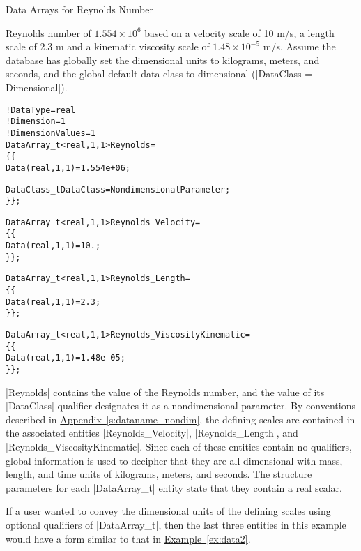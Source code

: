 \begin{example}{Data Arrays for Reynolds Number}
\label{ex:data5}

Reynolds number of $1.554 \!\times\! 10^{6}$ based on a velocity scale of
10 m/s, a length scale of 2.3 m and a kinematic viscosity scale of
$1.48 \!\times\! 10^{-5}$ m/s.
Assume the database has globally set the dimensional units to kilograms,
meters, and seconds, and the global default data class to dimensional
(|DataClass = Dimensional|).
\begin{alltt}
  !  DataType = real
  !  Dimension = 1
  !  DimensionValues = 1
  DataArray\_t<real, 1, 1> Reynolds =
    \{\{
    Data(real, 1, 1) = 1.554e+06 ;
    
    DataClass\_t DataClass = NondimensionalParameter ;
    \}\} ;

  DataArray\_t<real, 1, 1> Reynolds\_Velocity =
    \{\{
    Data(real, 1, 1) = 10. ;
    \}\} ;

  DataArray\_t<real, 1, 1> Reynolds\_Length =
    \{\{
    Data(real, 1, 1) = 2.3 ;
    \}\} ;

  DataArray\_t<real, 1, 1> Reynolds\_ViscosityKinematic =
    \{\{
    Data(real, 1, 1) = 1.48e-05 ;
    \}\} ;
\end{alltt}
|Reynolds| contains the value of the Reynolds number, and the value of its
|DataClass| qualifier designates it as a nondimensional parameter.
By conventions described in
\hyperref[s:dataname_nondim]{Appendix~\ref*{s:dataname_nondim}},
the defining scales are contained in the associated entities
|Reynolds_Velocity|, |Reynolds_Length|, and |Reynolds_ViscosityKinematic|.
Since each of these entities contain no qualifiers, global information
is used to decipher that they are all dimensional with mass, length, and
time units of kilograms, meters, and seconds.
The structure parameters for each |DataArray_t| entity state that they
contain a real scalar.

If a user wanted to convey the dimensional units of the defining scales
using optional qualifiers of |DataArray_t|, then the last three entities in
this example would have a form similar to that in
\hyperref[ex:data2]{Example~\ref*{ex:data2}}.
\end{example}
